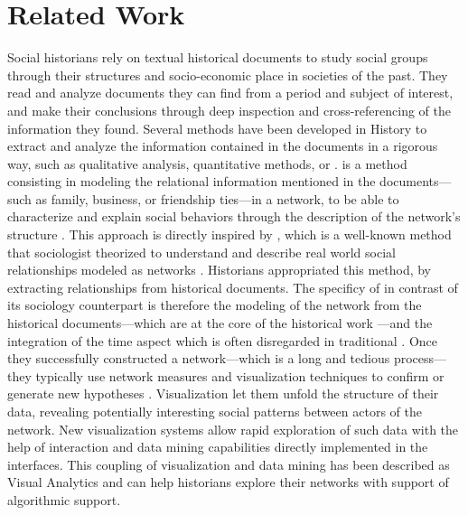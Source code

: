 
\chapter{Related Work}\label{ch:related-work}

Social historians rely on textual historical documents to study social groups through their structures and socio-economic place in societies of the past\cite{tilly1984retrieving}.
They read and analyze documents they can find from a period and subject of interest, and make their conclusions through deep inspection and cross-referencing of the information they found.
Several methods have been developed in History to extract and analyze the information contained in the documents in a rigorous way, such as qualitative analysis, quantitative methods, or \hsna.
\hsna is a method consisting in modeling the relational information mentioned in the documents---such as family, business, or friendship ties---in a network, to be able to characterize and explain social behaviors through the description of the network's structure \cite{wetherellHistoricalSocialNetwork1998, kerschbaumerPowerNetworksProspects2015}.
This approach is directly inspired by \sna, which is a well-known method that sociologist theorized to understand and describe real world social relationships modeled as networks \cite{freemanDevelopmentSocialNetwork2004, scottSocialNetworkAnalysis1988}.
Historians appropriated this method, by extracting relationships from historical documents.
The specificy of \hsna in contrast of its sociology counterpart is therefore the modeling of the network from the historical documents---which are at the core of the historical work \cite{prost2014}---and the integration of the time aspect which is often disregarded in traditional \sna.
Once they successfully constructed a network---which is a long and tedious process---they typically use network measures and visualization techniques to confirm or generate new hypotheses \cite{lemercier12FormalNetwork2015}.
Visualization let them unfold the structure of their data, revealing potentially interesting social patterns between actors of the network.
New visualization systems allow rapid exploration of such data with the help of interaction and data mining capabilities directly implemented in the interfaces.
This coupling of visualization and data mining has been described as Visual Analytics and can help historians explore their networks with support of algorithmic support.







